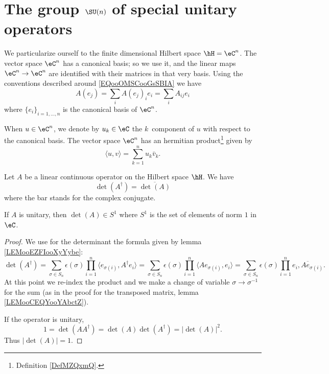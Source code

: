 \section{The group \texorpdfstring{$ \SU(n)$}{SUn} of special unitary operators}

We particularize ourself to the finite dimensional Hilbert space \( \hH=\eC^n\). The vector space \( \eC^n\) has a canonical basis; so we use it, and the linear maps \( \eC^n\to \eC^n\) are identified with their matrices in that very basis. Using the conventions described around \eqref{EQooOMSCooGsSBIA} we have 
\begin{equation}
    A(e_j)=\sum_iA(e_j)_ie_i=\sum_iA_{ij}e_i
\end{equation}
where \( \{ e_i \}_{i=1,\ldots, n}\) is the canonical basis of \( \eC^n\).

When \( u\in \eC^n\), we denote by \( u_k\in \eC\) the \( k\)\ieme\ component of \( u\) with respect to the canonical basis. The vector space \( \eC^n\) has an hermitian product\footnote{Definition \ref{DefMZQxmQ}.} given by
\begin{equation}
    \langle u, v\rangle =\sum_{k=1}^nu_k\bar v_k.
\end{equation}

\begin{lemma}       \label{LEMooKEUZooUjQVmp}
    Let \( A\) be a linear continuous operator on the Hilbert space \( \hH\). We have
    \begin{equation}
        \det(A^{\dag})=\overline{ \det(A) }
    \end{equation}
    where the bar stands for the complex conjugate.

    If \( A\) is unitary, then \( \det(A)\in S^1\) where \( S^1\) is the set of elements of norm \( 1\) in \( \eC\).
\end{lemma}

\begin{proof}
    We use for the determinant the formula given by lemma \ref{LEMooEZFIooXyYybe}:
    \begin{equation}
        \det(A^{\dag})=\sum_{\sigma\in S_n}\epsilon(\sigma)\prod_{i=1}^n\langle e_{\sigma(i)}, A^{\dag}e_i\rangle =  \sum_{\sigma\in S_n}\epsilon(\sigma)\prod_{i=1}^n \langle Ae_{\sigma(i)}, e_i\rangle = \sum_{\sigma\in S_n}\epsilon(\sigma)\prod_{i=1}^n\overline{ e_i,Ae_{\sigma(i)} }.
    \end{equation}
    At this point we re-index the product and we make a change of variable $\sigma\to \sigma^{-1}$ for the sum (as in the proof for the transposed matrix, lemma \ref{LEMooCEQYooYAbctZ}).

    If the operator is unitary,
    \begin{equation}
        1=\det(AA^{\dag})=\det(A)\det(A^{\dag})=| \det(A) |^2.
    \end{equation}
    Thus \( | \det(A) |=1\).
\end{proof}

